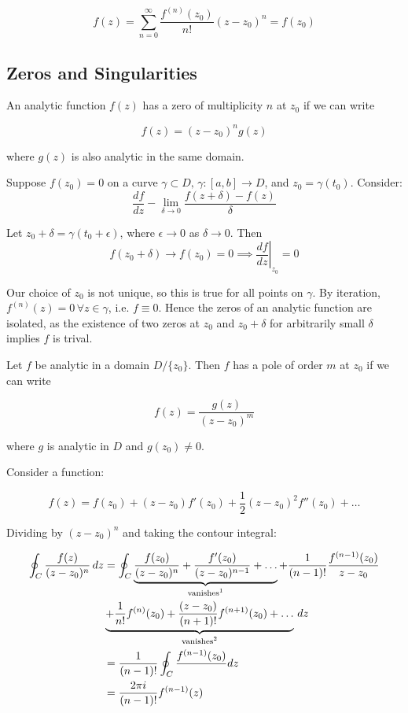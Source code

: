 \documentclass{physics_notes}
\begin{document}
\begin{equation}
f(z) = \sum_{n=0}^\infty \frac{f^{(n)}(z_0)}{n!} (z-z_0)^n = f(z_0)
\end{equation}

\subsection{Zeros and Singularities }

An analytic function $f(z)$ has a zero of multiplicity $n$ at $z_0$ if we can write 

\begin{equation}
f(z) = (z-z_0)^n g(z)
\end{equation}

where $g(z)$ is also analytic in the same domain. 

Suppose $f(z_0) = 0$ on a curve $\gamma \subset D, \, \gamma: [a,b] \to D$, and $z_0 = \gamma(t_0)$. Consider:
\[ \frac{df}{dz} - \lim_{\delta\to 0} \frac{f(z+\delta) - f(z)}{\delta}\]

Let $z_0 + \delta = \gamma(t_0 + \epsilon)$, where $\epsilon \to 0$ as $\delta \to 0$. Then
\[ f(z_0 + \delta) \to f(z_0) = 0 \implies \left.\frac{df}{dz}\right|_{z_0} = 0 \]

Our choice of $z_0$ is not unique, so this is true for all points on $\gamma$. By iteration, $f^{(n)}(z) = 0 \, \forall z \in \gamma$, i.e. $f \equiv 0$. Hence the zeros of an analytic function are isolated, as the existence of two zeros at $z_0$ and $z_0 + \delta$ for arbitrarily small $\delta$ implies $f$ is trival.

Let $f$ be analytic in a domain $D/\{z_0\}$. Then $f$ has a pole of order $m$ at $z_0$ if we can write

\begin{equation}
f(z) = \frac{g(z)}{(z - z_0)^m}
\end{equation}

where $g$ is analytic in $D$ and $g(z_0) \neq 0$. 

Consider a function:

\[ f(z) = f(z_0) + (z-z_0)f'(z_0) + \frac{1}{2}(z-z_0)^2f''(z_0) + \dots \]

Dividing by $(z-z_0)^n$ and taking the contour integral:

\begin{align*} \oint_C \frac{f(z)}{(z-z_0)^n}\, dz &= \oint_C \underbrace{\frac{f(z_0)}{(z-z_0)^n} + \frac{f'(z_0)}{(z-z_0)^{n-1}} + \dots}_\text{vanishes\footnotemark} + \frac{1}{(n-1)!}\frac{f^{(n-1)}(z_0)}{z - z_0} \\ 
&\underbrace{ + \frac{1}{n!}f^{(n)}(z_0) + \frac{(z - z_0)}{(n+1)!}f^{(n+1)}(z_0) + \dots}_\text{vanishes\footnotemark} \, dz \\
&= \frac{1}{(n-1)!} \oint_C \frac{f^{(n-1)}(z_0)} \, dz \\
&= \frac{2\pi i}{(n-1)!} f^{(n-1)}(z) \end{align*}
\end{document}
